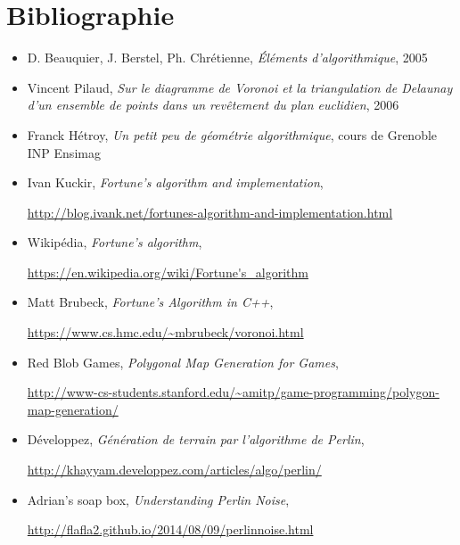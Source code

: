 \documentclass[a4paper, 10pt]{article}
\begin{document}
\newpage
\section{Bibliographie}  
\begin{itemize}
\item D. Beauquier, J. Berstel, Ph. Chrétienne, \textit{Éléments d'algorithmique}, 2005  
  
\item Vincent Pilaud, \textit{Sur le diagramme de Voronoi et la triangulation de Delaunay d’un ensemble de points dans un revêtement du plan euclidien}, 2006  

\item Franck Hétroy, \textit{Un petit peu de géométrie algorithmique}, cours de Grenoble INP Ensimag
  
\item Ivan Kuckir, \textit{Fortune’s algorithm and implementation},  
  
\url{http://blog.ivank.net/fortunes-algorithm-and-implementation.html}      
  
\item Wikipédia, \textit{Fortune's algorithm}, 

\url{https://en.wikipedia.org/wiki/Fortune's_algorithm}    
  
\item Matt Brubeck, \textit{Fortune's Algorithm in C++},  
  
\url{https://www.cs.hmc.edu/~mbrubeck/voronoi.html}  

\item Red Blob Games, \textit{Polygonal Map Generation for Games},   
  
\url{http://www-cs-students.stanford.edu/~amitp/game-programming/polygon-map-generation/}  
  
\item Développez, \textit{Génération de terrain par l'algorithme de Perlin},  
  
\url{http://khayyam.developpez.com/articles/algo/perlin/}  
  
\item Adrian's soap box, \textit{Understanding Perlin Noise},  
  
\url{http://flafla2.github.io/2014/08/09/perlinnoise.html}
\end{itemize}
\newpage
\end{document}
